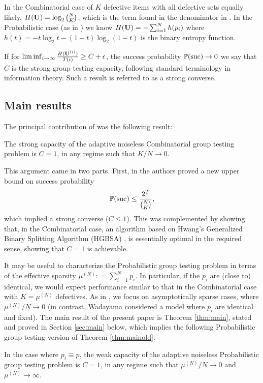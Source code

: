 %
\begin{remark}
In the Combinatorial case of $K$ defective items with all defective sets equally
likely, $ H({\mathbf{ U}}) = \log_2 \binom{N}{K}$, which is the term found in the denominator in \cite[Eq. (1) and (2)]{johnsonc10}. In the Probabilistic case (as in \cite{li5}) 
 we know $H({\mathbf{ U}}) = -\sum_{i=1}^N h(p_i)$ where $h(t) = -t \log_2 t - (1-t) \log_2(1-t)$ is the binary entropy function. 
\end{remark}
%
\begin{remark} If for $ \liminf_{i \rightarrow \infty} \frac{ H({\mathbf{ U}}^{(i)}) }{T(i)} \geq C+ \epsilon$, the success probability 
${\mathbb{P}}({\rm suc}) \rightarrow 0$ we say that $C$ is the strong group testing capacity, following standard terminology in information
theory. Such a result is referred to as a strong converse.
\end{remark}

\subsection{Main results}

The principal contribution of \cite[Theorem 1.2]{johnsonc10} was the following result:
%
\begin{theorem} \label{thm:mainold}
The strong capacity of the adaptive noiseless Combinatorial group testing problem
  is  $C = 1$,
  in any regime such that $K/N \rightarrow 0$.
\end{theorem}
%
This argument came in two parts. First, in \cite[Theorem 3.1]{johnsonc10} the authors  proved a new
upper bound on success probability 
\begin{equation} \label{eq:bja} {\mathbb{P}}({\rm suc}) \leq \frac{2^T}{\binom{N}{K}}, \end{equation} which implied a strong converse ($C \leq 1$). This was complemented 
by 
showing that, in the Combinatorial case, an algorithm based on 
Hwang's Generalized Binary Splitting Algorithm (HGBSA) \cite{hwang}, \cite{du} is essentially optimal in the required sense,
showing that $C=1$ is achievable.


It may be useful to characterize the Probabilistic group testing problem in 
terms of the effective sparsity $\mu^{(N)}: = \sum_{i=1}^N p_i$. In particular, if the $p_i$ are (close to) identical, we would expect performance similar to that in the Combinatorial
case with $K = \mu^{(N)}$ defectives. As in \cite{johnsonc10}, we  focus on asymptotically sparse cases, where $\mu^{(N)}/N \rightarrow 0$ (in contrast, Wadayama
\cite{wadayama} considered a model where $p_i$ are identical and fixed).
The main result of the present paper is Theorem \ref{thm:main}, stated and proved in Section \ref{sec:main} below, which implies the 
following  Probabilistic group testing version of Theorem \ref{thm:mainold}.
\begin{corollary} \label{cor:main}
 In the case where $p_i \equiv p$, the weak capacity of the adaptive noiseless Probabilistic group testing problem
  is  $C = 1$, in any regime such that $\mu^{(N)}/N \rightarrow 0$ and $\mu^{(N)} \rightarrow \infty$.
  \end{corollary}



